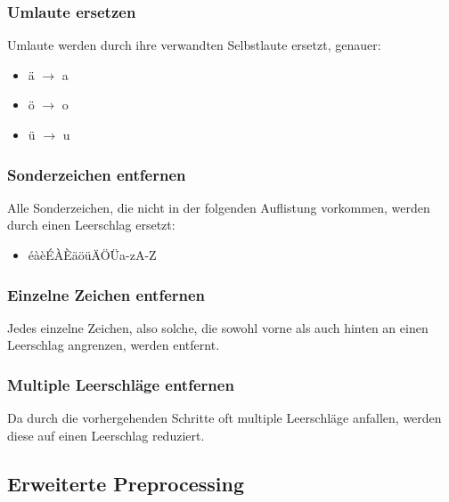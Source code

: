 \subsubsection{Umlaute ersetzen}
Umlaute werden durch ihre verwandten Selbstlaute ersetzt, genauer:
\begin{itemize}
	\item ä $\rightarrow$ a
	\item ö $\rightarrow$ o
	\item ü $\rightarrow$ u
\end{itemize} 
\subsubsection{Sonderzeichen entfernen}
Alle Sonderzeichen, die nicht in der folgenden Auflistung vorkommen, werden durch einen Leerschlag ersetzt:
\begin{itemize}
	\item éàèÉÀÈäöüÄÖÜa-zA-Z
\end{itemize} 
\subsubsection{Einzelne Zeichen entfernen}
Jedes einzelne Zeichen, also solche, die sowohl vorne als auch hinten an einen Leerschlag angrenzen, werden entfernt.
\subsubsection{Multiple Leerschläge entfernen}
Da durch die vorhergehenden Schritte oft multiple Leerschläge anfallen, werden diese auf einen Leerschlag reduziert.
\subsection{Erweiterte Preprocessing}\label{sec:advancedpre}
